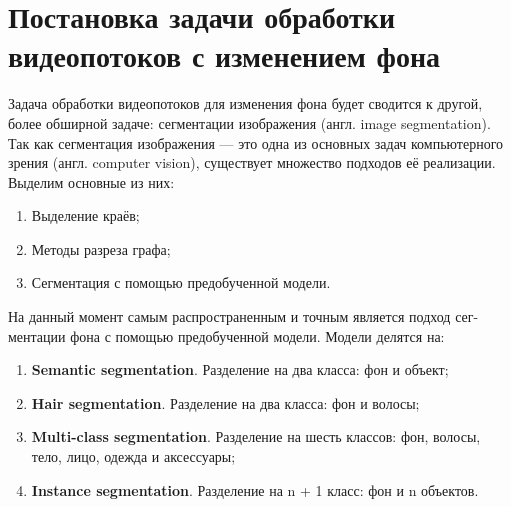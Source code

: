 \documentclass[a4paper,14pt]{extreport}
\begin{document}
    \chapter{Постановка задачи обработки видеопотоков с изменением фона}
    Задача обработки видеопотоков для изменения фона будет сводится к другой, более обширной задаче: сегментации изображения (англ. image segmentation). Так как сегментация изображения — это одна из основных задач компьютерного зрения (англ. computer vision), существует множество подходов её реализации. Выделим основные из них:
    \begin{enumerate}
        \item Выделение краёв;
        \item Методы разреза графа;
        \item Сегментация с помощью предобученной модели.
    \end{enumerate}
    На данный момент самым распространенным и точным является подход сег- ментации фона с помощью предобученной модели. Модели делятся на:
    \begin{enumerate}
        \item \textbf{Semantic segmentation}. Разделение на два класса: фон и объект;
        \item \textbf{Hair segmentation}. Разделение на два класса: фон и волосы;
        \item \textbf{Multi-class segmentation}. Разделение на шесть классов: фон, волосы, тело, лицо, одежда и аксессуары;
        \item \textbf{Instance segmentation}. Разделение на n + 1 класс: фон и n объектов.
    \end{enumerate}
\end{document}
